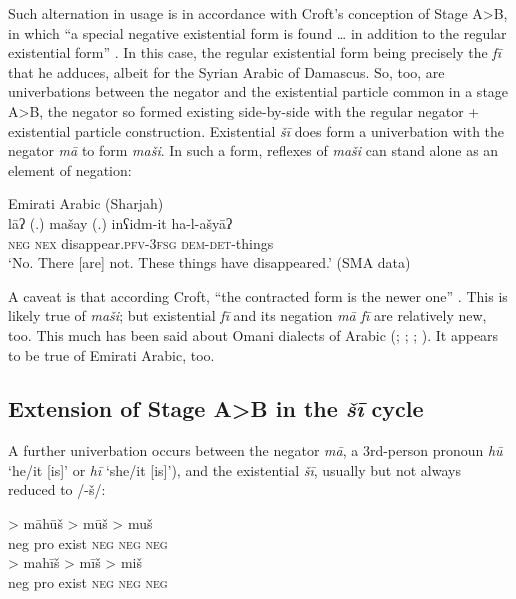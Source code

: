 \documentclass[output=paper]{langsci/langscibook}
\begin{document}
Such alternation in usage is in accordance with Croft’s conception of Stage A>B, in which “a special negative existential form is found … in addition to the regular existential form” \citeyearpar[7]{Croft1991}. In this case, the regular existential form being precisely the \textit{fī} that he adduces, albeit for the Syrian Arabic of Damascus. So, too, are univerbations between the negator and the existential particle common in a stage A>B, the negator so formed existing side-by-side with the regular negator + existential particle construction. Existential \textit{šī} does form a univerbation with the negator \textit{mā} to form \textit{maši}. In such a form, reflexes of \textit{maši} can stand alone as an element of negation:

\ea Emirati Arabic (Sharjah)\label{ex:WiAR-13}\\
	\gll lāʔ (.) mašay (.) inʕidm-it ha-l-ašyāʔ \\
	\textsc{neg} {} \textsc{nex} {} disappear.\textsc{pfv-3fsg} \textsc{dem-det}-things \\
	\glt ‘No. There [are] not. These things have disappeared.’ (SMA data)
\z

A caveat is that according Croft, “the contracted form is the newer one” \citep[7]{Croft1991}. This is likely true of \textit{maši}; but existential \textit{fī} and its negation \textit{mā fī} are relatively new, too. This much has been said about Omani dialects of Arabic (\citealp[24]{brockett1985a}; \citealp[71]{holes1990a}; \citealp[61]{bernabela2011a}; \citealp[171]{davey2016a}). It appears to be true of Emirati Arabic, too. 

\subsection{Extension of Stage A>B in the \textit{šī} cycle} \label{s:WiAR-3.2}

A further univerbation occurs between the negator \textit{mā}, a 3rd-person pronoun \textit{hū} ‘he/it [is]’ or \textit{hī} ‘she/it [is]’), and the existential \textit{šī}, usually but not always reduced to /-š/:

\ea \label{ex:WiAR-14}
  \ea
  	 > māhūš > mūš > muš\\
  	{\sc neg pro exist} {} \textsc{neg} {} \textsc{neg} {} \textsc{neg}\\
  \ex
  	 > mahīš > mīš > miš\\
  	{\sc neg pro exist} {} \textsc{neg}  {} \textsc{neg} {} \textsc{neg}\\
\z \z
\end{document}
